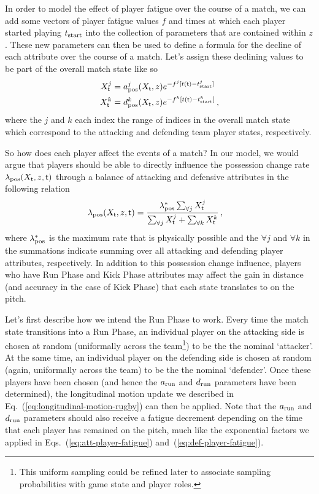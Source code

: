 In order to model the effect of player fatigue over the course of a match, we can add some vectors of player fatigue values $f$ and times at which each player started playing $t_{\rm start}$ into the collection of parameters that are contained within $z$. These new parameters can then be used to define a formula for the decline of each attribute over the course of a match. Let's assign these declining values to be part of the overall match state like so
\begin{align}
X^j_{\sf t} &= a^j_{\rm pos}(X_{\sf t}, z)e^{-f^j[t({\sf t})-t^j_{\rm start}]} \label{eq:att-player-fatigue} \\
X^k_{\sf t} &= d^k_{\rm pos}(X_{\sf t}, z)e^{-f^k[t({\sf t})-t^k_{\rm start}]} \label{eq:def-player-fatigue} \,,
\end{align}
where the $j$ and $k$ each index the range of indices in the overall match state which correspond to the attacking and defending team player states, respectively.

So how does each player affect the events of a match? In our model, we would argue that players should be able to directly influence the possession change rate $\lambda_{\rm pos}(X_{\sf t}, z, {\sf t})$ through a balance of attacking and defensive attributes in the following relation
\begin{align}
\lambda_{\rm pos}(X_{\sf t}, z, {\sf t}) &= \frac{\lambda^*_{\rm pos}\sum_{\forall j}X^j_{{\sf t}}}{\sum_{\forall j}X^j_{{\sf t}} + \sum_{\forall k}X^k_{{\sf t}}}\,,
\end{align}
where $\lambda^*_{\rm pos}$ is the maximum rate that is physically possible and the $\forall j$ and $\forall k$ in the summations indicate summing over all attacking and defending player attributes, respectively. In addition to this possession change influence, players who have {\sf Run Phase} and {\sf Kick Phase} attributes may affect the gain in distance (and accuracy in the case of {\sf Kick Phase}) that each state translates to on the pitch. 

Let's first describe how we intend the {\sf Run Phase} to work. Every time the match state transitions into a {\sf Run Phase}, an individual player on the attacking side is chosen at random (uniformally across the team\footnote{This uniform sampling could be refined later to associate sampling probabilities with game state and player roles.}) to be the the nominal `attacker'. At the same time, an individual player on the defending side is chosen at random (again, uniformally across the team) to be the the nominal `defender'. Once these players have been chosen (and hence the $a_{\rm run}$ and $d_{\rm run}$ parameters have been determined), the longitudinal motion update we described in Eq.~(\ref{eq:longitudinal-motion-rugby}) can then be applied. Note that the $a_{\rm run}$ and $d_{\rm run}$ parameters should also receive a fatigue decrement depending on the time that each player has remained on the pitch, much like the exponential factors we applied in Eqs.~(\ref{eq:att-player-fatigue}) and~(\ref{eq:def-player-fatigue}).

